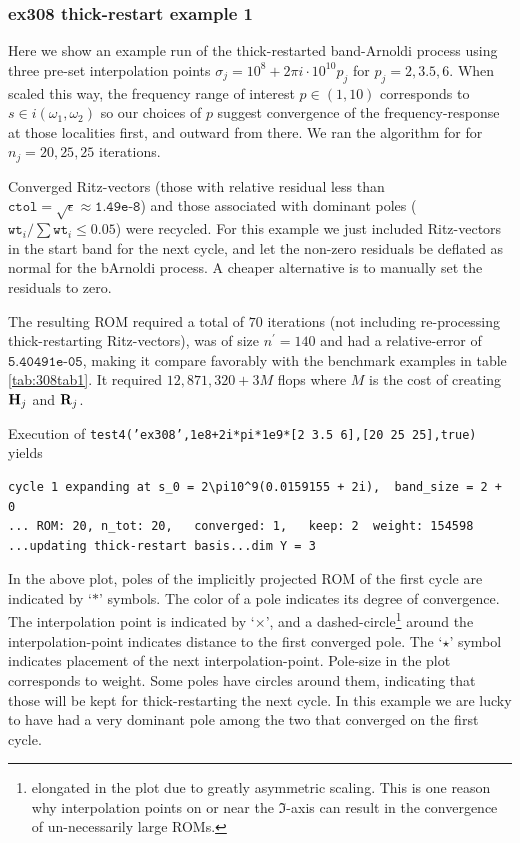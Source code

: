 \subsubsection{ex308 thick-restart example 1}
Here we show an example run of the thick-restarted band-Arnoldi process using three pre-set interpolation points $\sigma_j = 10^8 + 2\pi i \cdot 10^{10} p_j$ for   $p_j =2, 3.5, 6$.  When scaled this way, the frequency range of interest $p\in (1,10)$ corresponds to $s\in i(\omega_1,\omega_2)$ so our choices of $p$ suggest convergence of the frequency-response at those localities first, and outward from there.      We ran the algorithm for  for $n_j=20,25,25$ iterations. 

 Converged Ritz-vectors (those with relative residual less than $\texttt{ctol}=\sqrt{\epsilon}\approx \texttt{1.49e-8}$) and those associated with dominant poles ($\texttt{wt}_i/\sum\texttt{wt}_i\leq 0.05$) were recycled.   For this example we just included Ritz-vectors in the start band for the next cycle, and let the non-zero residuals be deflated as normal for the bArnoldi process.  A cheaper alternative is to manually set the residuals to zero.     
   

The resulting ROM required a total of $70$ iterations (not including re-processing thick-restarting Ritz-vectors), was of size  $n^\prime=140$ and had a relative-error of $\texttt{5.40491e-05}$, making it compare favorably with the benchmark examples in table \ref{tab:308tab1}.   It required $12,871,320 + 3M$ flops where $M$ is the cost of creating $\textbf{\textup{H}}_j$ and $\textbf{\textup{R}}_j$.   

Execution of  \texttt{test4('ex308',1e8+2i*pi*1e9*[2 3.5 6],[20 25 25],true)} yields


\begin{verbatim}cycle 1 expanding at s_0 = 2\pi10^9(0.0159155 + 2i),  band_size = 2 + 0 
... ROM: 20, n_tot: 20,   converged: 1,   keep: 2  weight: 154598
...updating thick-restart basis...dim Y = 3
\end{verbatim}

In the above plot, poles of the implicitly projected ROM of the first cycle are indicated by `$*$' symbols.  The color of a pole indicates its degree of convergence.  The interpolation point is indicated by `$\times$', and a dashed-circle\footnote{elongated in the plot due to greatly asymmetric scaling.  This is one reason why interpolation points on or near the $\Im$-axis can result in the convergence of un-necessarily large ROMs.} around the interpolation-point indicates distance to the first converged pole.  The `$\star$' symbol indicates placement of the next interpolation-point.    Pole-size in the plot corresponds to weight.  Some poles have circles around them, indicating that those will be kept for thick-restarting the next cycle.    In this example we are lucky to have had a very dominant pole among the two that converged on the first cycle.    




